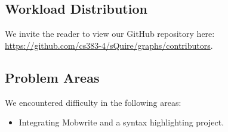 \documentclass[twoside,letterpaper]{article}
\begin{document}
\subsection{Workload Distribution}
We invite the reader to view our GitHub repository here: \url{https://github.com/cs383-4/sQuire/graphs/contributors}.

\subsection{Problem Areas}
We encountered difficulty in the following areas:
\begin{itemize}
	\item Integrating Mobwrite and a syntax highlighting project. 

\end{itemize} 



\bigskip
\end{document}
